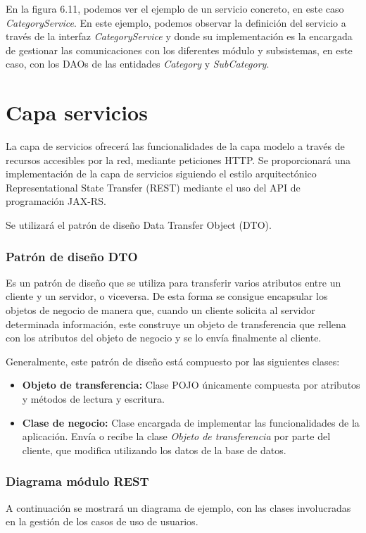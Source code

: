 En la figura 6.11, podemos ver el ejemplo de un servicio concreto, en este caso \textit{CategoryService}. En este ejemplo, podemos observar la definición del servicio a través de la interfaz \textit{CategoryService} y donde su implementación es la encargada de gestionar las comunicaciones con los diferentes módulo y subsistemas, en este caso, con los DAOs de las entidades \textit{Category} y \textit{SubCategory}.



\section{Capa servicios}
La capa de servicios ofrecerá las funcionalidades de la capa modelo a través de recursos accesibles por la red, mediante peticiones HTTP. Se proporcionará una implementación de la capa de servicios siguiendo el  estilo arquitectónico Representational State Transfer (REST) mediante el uso del API de programación JAX-RS.

Se utilizará el patrón de diseño Data Transfer Object (DTO).

\subsubsection*{Patrón de diseño DTO}
Es un patrón de diseño que se utiliza para transferir varios atributos entre un cliente y un servidor, o viceversa. De esta forma se consigue encapsular los objetos de negocio de manera que, cuando un cliente solicita al servidor determinada información, este construye un objeto de transferencia que rellena con los atributos del objeto de negocio y se lo envía finalmente al cliente.

Generalmente, este patrón de diseño está compuesto por las siguientes clases:

\begin{itemize}
	\item \textbf{Objeto de transferencia: } Clase POJO únicamente compuesta por atributos y métodos de lectura y escritura.
	\item \textbf{Clase de negocio: } Clase encargada de implementar las funcionalidades de la aplicación. Envía o recibe la clase \textit{Objeto de transferencia} por parte del cliente, que modifica utilizando los datos de la base de datos.
\end{itemize}


\subsubsection*{Diagrama módulo REST}
A continuación se mostrará un diagrama de ejemplo, con las clases involucradas en la gestión de los casos de uso de usuarios.

